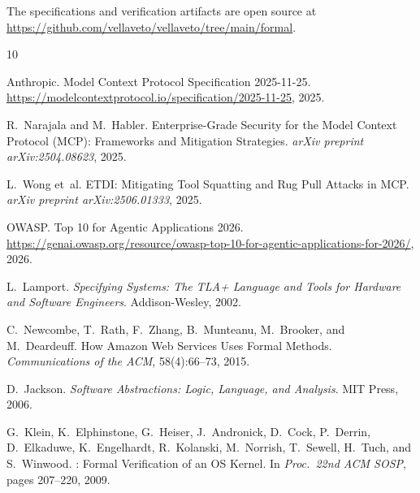 \documentclass[sigplan,screen,nonacm]{acmart}
\begin{document}
The specifications and verification artifacts are open source at
\url{https://github.com/vellaveto/vellaveto/tree/main/formal}.



\begin{thebibliography}{10}

Anthropic.
\newblock Model Context Protocol Specification 2025-11-25.
\newblock \url{https://modelcontextprotocol.io/specification/2025-11-25}, 2025.

R.~Narajala and M.~Habler.
\newblock Enterprise-Grade Security for the Model Context Protocol (MCP):
  Frameworks and Mitigation Strategies.
\newblock \emph{arXiv preprint arXiv:2504.08623}, 2025.

L.~Wong et~al.
\newblock ETDI: Mitigating Tool Squatting and Rug Pull Attacks in MCP.
\newblock \emph{arXiv preprint arXiv:2506.01333}, 2025.

OWASP.
\newblock Top 10 for Agentic Applications 2026.
\newblock \url{https://genai.owasp.org/resource/owasp-top-10-for-agentic-applications-for-2026/}, 2026.

L.~Lamport.
\newblock \emph{Specifying Systems: The TLA+ Language and Tools for Hardware
  and Software Engineers}.
\newblock Addison-Wesley, 2002.

C.~Newcombe, T.~Rath, F.~Zhang, B.~Munteanu, M.~Brooker, and M.~Deardeuff.
\newblock How {Amazon} Web Services Uses Formal Methods.
\newblock \emph{Communications of the ACM}, 58(4):66--73, 2015.

D.~Jackson.
\newblock \emph{Software Abstractions: Logic, Language, and Analysis}.
\newblock MIT Press, 2006.

G.~Klein, K.~Elphinstone, G.~Heiser, J.~Andronick, D.~Cock, P.~Derrin,
  D.~Elkaduwe, K.~Engelhardt, R.~Kolanski, M.~Norrish, T.~Sewell,
  H.~Tuch, and S.~Winwood.
: Formal Verification of an {OS} Kernel.
\newblock In \emph{Proc.\ 22nd ACM SOSP}, pages 207--220, 2009.

\end{thebibliography}
\end{document}
